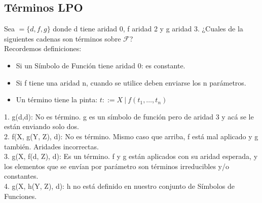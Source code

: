 \documentclass[10pt,a4paper]{article}
\begin{document}
\subsection*{Términos LPO}
\label{subsec:terminos_lpo}
Sea $\mathcal = \{d, f, g\}$ donde d tiene aridad 0, f aridad 2 y g aridad 3. ¿Cuales de la siguientes cadenas son términos sobre $\mathcal{F}$? \\
Recordemos definiciones: 
\begin{itemize}
    \item Si un Símbolo de Función tiene aridad 0: es constante.
    \item Si f tiene una aridad n, cuando se utilice deben enviarse los n parámetros. 
    \item Un término tiene la pinta: $t ::= X \ | \ f(t_{1}, \dots, t_{n})$
\end{itemize}
1. g(d,d): No es término. g es un símbolo de función pero de aridad 3 y acá se le están enviando solo dos. \\
2. f(X, g(Y, Z), d): No es término. Mismo caso que arriba, f está mal aplicado y g también. Aridades incorrectas. \\
3. g(X, f(d, Z), d): Es un término. f y g están aplicados con su aridad esperada, y los elementos que se envían por parámetro son términos irreducibles y/o constantes. \\
4. g(X, h(Y, Z), d): h no está definido en nuestro conjunto de Símbolos de Funciones. \\
\end{document}
